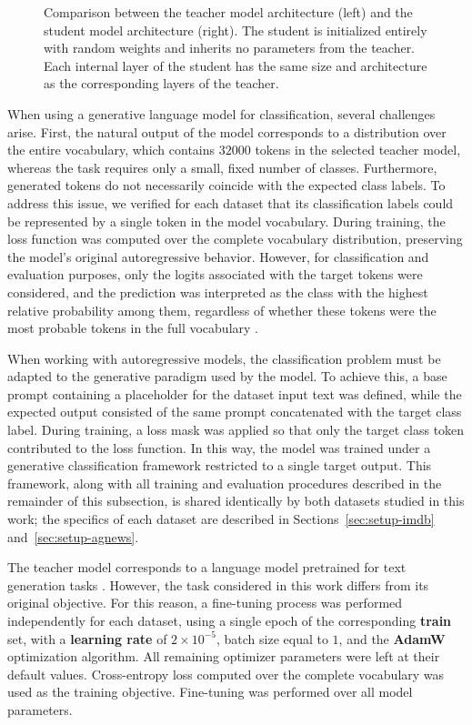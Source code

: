 \documentclass[conference]{IEEEtran}
\begin{document}
\begin{figure}
\centering
\def\svgwidth{0.9\linewidth}

\caption{Comparison between the teacher model architecture (left) and the student model architecture (right). The student is initialized entirely with random weights and inherits no parameters from the teacher. Each internal layer of the student has the same size and architecture as the corresponding layers of the teacher.}
\label{architecture_reduction}
\end{figure}

When using a generative language model for classification, several challenges arise. First, the natural output of the model corresponds to a distribution over the entire vocabulary, which contains $32000$ tokens in the selected teacher model, whereas the task requires only a small, fixed number of classes. Furthermore, generated tokens do not necessarily coincide with the expected class labels. To address this issue, we verified for each dataset that its classification labels could be represented by a single token in the model vocabulary. During training, the loss function was computed over the complete vocabulary distribution, preserving the model's original autoregressive behavior. However, for classification and evaluation purposes, only the logits associated with the target tokens were considered, and the prediction was interpreted as the class with the highest relative probability among them, regardless of whether these tokens were the most probable tokens in the full vocabulary \cite{daillm}.

When working with autoregressive models, the classification problem must be adapted to the generative paradigm used by the model. To achieve this, a base prompt containing a placeholder for the dataset input text was defined, while the expected output consisted of the same prompt concatenated with the target class label. During training, a loss mask was applied so that only the target class token contributed to the loss function. In this way, the model was trained under a generative classification framework restricted to a single target output. This framework, along with all training and evaluation procedures described in the remainder of this subsection, is shared identically by both datasets studied in this work; the specifics of each dataset are described in Sections~\ref{sec:setup-imdb} and~\ref{sec:setup-agnews}.

The teacher model corresponds to a language model pretrained for text generation tasks \cite{zhang2024tinyllama}. However, the task considered in this work differs from its original objective. For this reason, a fine-tuning process was performed independently for each dataset, using a single epoch of the corresponding \textbf{train} set, with a \textbf{learning rate} of $2 \times 10^{-5}$, batch size equal to $1$, and the \textbf{AdamW} optimization algorithm. All remaining optimizer parameters were left at their default values. Cross-entropy loss computed over the complete vocabulary was used as the training objective. Fine-tuning was performed over all model parameters.
\end{document}

